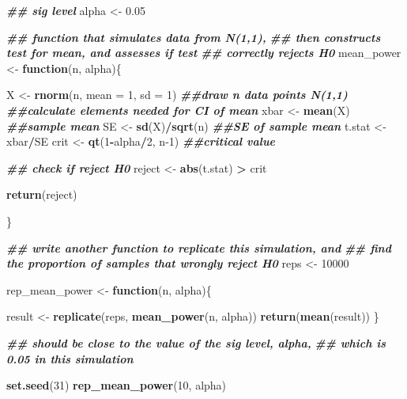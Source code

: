 \documentclass[
]{book}
\newenvironment{Shaded}{\begin{snugshade}}{\end{snugshade}}
\newcommand{\AttributeTok}[1]{\textcolor[rgb]{0.13,0.29,0.53}{#1}}
\newcommand{\ControlFlowTok}[1]{\textcolor[rgb]{0.13,0.29,0.53}{\textbf{#1}}}
\newcommand{\DecValTok}[1]{\textcolor[rgb]{0.00,0.00,0.81}{#1}}
\newcommand{\DocumentationTok}[1]{\textcolor[rgb]{0.56,0.35,0.01}{\textbf{\textit{#1}}}}
\newcommand{\FloatTok}[1]{\textcolor[rgb]{0.00,0.00,0.81}{#1}}
\newcommand{\FunctionTok}[1]{\textcolor[rgb]{0.13,0.29,0.53}{\textbf{#1}}}
\newcommand{\NormalTok}[1]{#1}
\newcommand{\OtherTok}[1]{\textcolor[rgb]{0.56,0.35,0.01}{#1}}
\newcommand{\SpecialCharTok}[1]{\textcolor[rgb]{0.81,0.36,0.00}{\textbf{#1}}}
\theoremstyle{definition}
\theoremstyle{definition}
\theoremstyle{definition}
\theoremstyle{definition}
\theoremstyle{remark}
\begin{document}
\begin{Shaded}
\begin{Highlighting}[]
\DocumentationTok{\#\# sig level}
\NormalTok{alpha }\OtherTok{\textless{}{-}} \FloatTok{0.05}

\DocumentationTok{\#\# function that simulates data from N(1,1),}
\DocumentationTok{\#\# then constructs test for mean, and assesses if test}
\DocumentationTok{\#\# correctly rejects H0}
\NormalTok{mean\_power }\OtherTok{\textless{}{-}} \ControlFlowTok{function}\NormalTok{(n, alpha)\{}
  
\NormalTok{  X }\OtherTok{\textless{}{-}} \FunctionTok{rnorm}\NormalTok{(n, }\AttributeTok{mean =} \DecValTok{1}\NormalTok{, }\AttributeTok{sd =} \DecValTok{1}\NormalTok{) }\DocumentationTok{\#\#draw n data points N(1,1)}
  \DocumentationTok{\#\#calculate elements needed for CI of mean}
\NormalTok{  xbar }\OtherTok{\textless{}{-}} \FunctionTok{mean}\NormalTok{(X) }\DocumentationTok{\#\#sample mean}
\NormalTok{  SE }\OtherTok{\textless{}{-}} \FunctionTok{sd}\NormalTok{(X)}\SpecialCharTok{/}\FunctionTok{sqrt}\NormalTok{(n) }\DocumentationTok{\#\#SE of sample mean}
\NormalTok{  t.stat }\OtherTok{\textless{}{-}}\NormalTok{ xbar}\SpecialCharTok{/}\NormalTok{SE}
\NormalTok{  crit }\OtherTok{\textless{}{-}} \FunctionTok{qt}\NormalTok{(}\DecValTok{1}\SpecialCharTok{{-}}\NormalTok{alpha}\SpecialCharTok{/}\DecValTok{2}\NormalTok{, n}\DecValTok{{-}1}\NormalTok{) }\DocumentationTok{\#\#critical value}
  
  \DocumentationTok{\#\# check if reject H0}
\NormalTok{  reject }\OtherTok{\textless{}{-}} \FunctionTok{abs}\NormalTok{(t.stat) }\SpecialCharTok{\textgreater{}}\NormalTok{ crit}
 
  \FunctionTok{return}\NormalTok{(reject)}
  
\NormalTok{\}}

\DocumentationTok{\#\# write another function to replicate this simulation, and}
\DocumentationTok{\#\# find the proportion of samples that wrongly reject H0}
\NormalTok{reps }\OtherTok{\textless{}{-}} \DecValTok{10000}

\NormalTok{rep\_mean\_power }\OtherTok{\textless{}{-}} \ControlFlowTok{function}\NormalTok{(n, alpha)\{}
  
\NormalTok{  result }\OtherTok{\textless{}{-}} \FunctionTok{replicate}\NormalTok{(reps, }\FunctionTok{mean\_power}\NormalTok{(n, alpha))}
  \FunctionTok{return}\NormalTok{(}\FunctionTok{mean}\NormalTok{(result))}
\NormalTok{\}}

\DocumentationTok{\#\# should be close to the value of the sig level, alpha, }
\DocumentationTok{\#\# which is 0.05 in this simulation}

\FunctionTok{set.seed}\NormalTok{(}\DecValTok{31}\NormalTok{)}
\FunctionTok{rep\_mean\_power}\NormalTok{(}\DecValTok{10}\NormalTok{, alpha)}
\end{Highlighting}
\end{Shaded}
\end{document}
